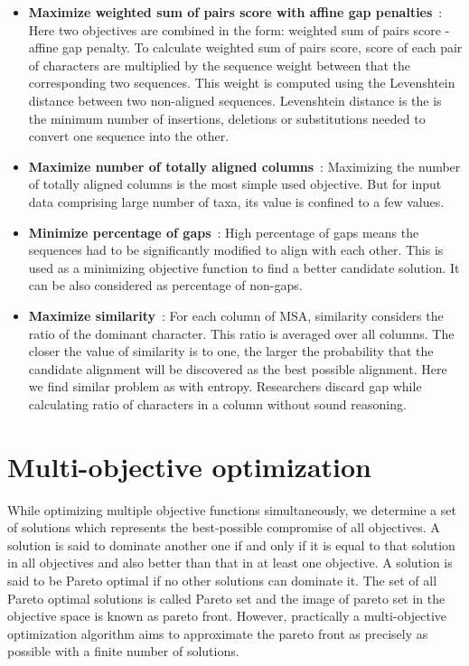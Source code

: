 \begin{itemize}
	\item \textbf{Maximize weighted sum of pairs score with affine gap penalties}~\cite{rubio2016hybrid, rubio2016bee}:  
	Here two objectives are combined in the form: weighted sum of pairs score - affine gap penalty. To calculate weighted sum of pairs score, score of each pair of characters are multiplied by the sequence weight between that the corresponding two sequences. This weight is computed using the Levenshtein distance between two non-aligned sequences. Levenshtein distance is the is the minimum number of insertions, deletions or substitutions needed to convert one sequence into the other. 
	
	\item \textbf{Maximize number of totally aligned columns}~\cite{ortuno2013optimizing, da2010alineaga, rubio2016hybrid, rubio2016bee, ortuno2013optimizing, zambrano2017comparing}:
	Maximizing the number of totally aligned columns is the most simple used objective. But for input data comprising large number of taxa, its value is confined to a few values.
	
	\item \textbf{Minimize percentage of gaps}~\cite{abbasi2015local, ortuno2013optimizing, zambrano2017comparing}:
	High percentage of gaps means the sequences had to be significantly modified to align with each other. This is used as a minimizing objective function to find a better candidate solution. It can be also considered as percentage of non-gaps.
	
	\item \textbf{Maximize similarity}~\cite{kaya2014multiple, rani2016multiple}:
	For each column of MSA, similarity considers the ratio of the dominant character. This ratio is averaged over all columns. The closer the value of similarity is to one, the larger the probability that the candidate alignment will be discovered as the best possible alignment. Here we find similar problem as with entropy. Researchers discard gap while calculating ratio of characters in a column without sound reasoning. 
	
\end{itemize}

\section{Multi-objective optimization}
\label{sec:mop}
While optimizing multiple objective functions simultaneously, we determine a set of solutions which represents the best-possible compromise of all objectives. A solution is said to dominate another one if and only if it is equal to that solution in all objectives and also better than that in at least one objective. A solution is said to be Pareto optimal if no other solutions can dominate it. The set of all Pareto optimal solutions is called Pareto set and the image of pareto set in the objective space is known as pareto front. However, practically a multi-objective optimization algorithm aims to approximate the pareto front as precisely as possible with a finite number of solutions.

